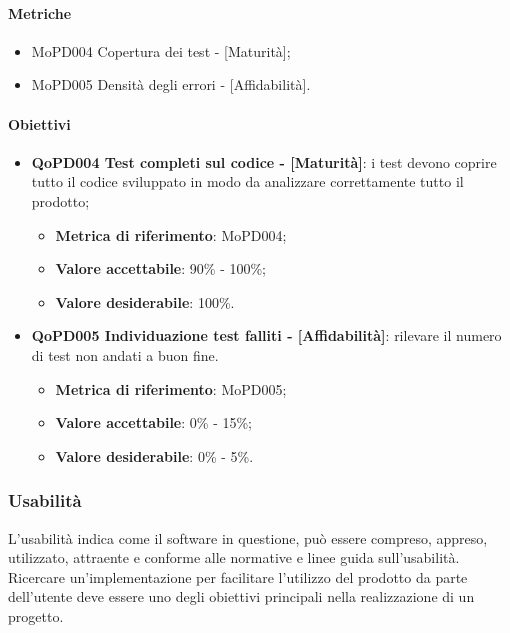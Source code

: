 \documentclass[../piano-di-qualifica.tex]{subfiles}
\begin{document}
\paragraph{Metriche}
\label{sub:metriche}
\begin{itemize}
    \item MoPD004 Copertura dei test - [Maturità];
    \item MoPD005 Densità degli errori - [Affidabilità].
\end{itemize}

\paragraph{Obiettivi}
\label{sub:obiettivi}
\begin{itemize}
    \item \textbf{QoPD004 Test completi sul codice - [Maturità]}: i test devono coprire tutto il codice sviluppato in modo da analizzare correttamente tutto il prodotto;
        \begin{itemize}
            \item \textbf{Metrica di riferimento}: MoPD004;
            \item \textbf{Valore accettabile}: 90\% - 100\%;
            \item \textbf{Valore desiderabile}: 100\%.
        \end{itemize}
    \item \textbf{QoPD005 Individuazione test falliti - [Affidabilità]}: rilevare il numero di test non andati a buon fine.
        \begin{itemize}
            \item \textbf{Metrica di riferimento}: MoPD005;
            \item \textbf{Valore accettabile}: 0\% - 15\%;
            \item \textbf{Valore desiderabile}: 0\% - 5\%.
        \end{itemize}
\end{itemize}

\subsubsection{Usabilità}%
\label{sub:usabilita}
L'usabilità indica come il software in questione, può essere compreso, appreso, utilizzato, attraente e conforme alle normative e linee guida sull'usabilità.
Ricercare un'implementazione per facilitare l'utilizzo del prodotto da parte dell'utente deve essere uno degli obiettivi principali nella realizzazione di un progetto.
\end{document}
